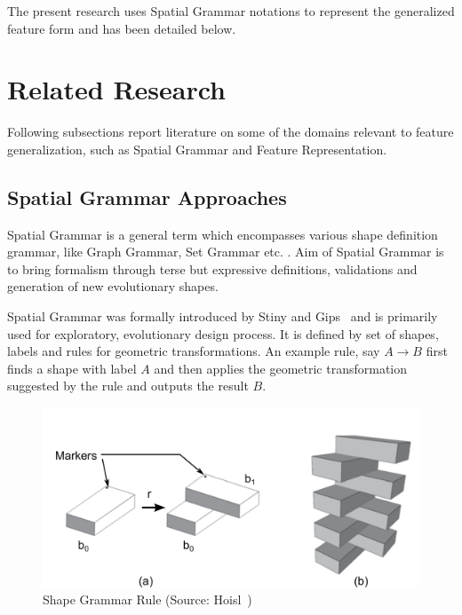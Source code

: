 The present research uses Spatial Grammar notations to represent the generalized feature form and has been detailed below. 

\section{Related Research}

Following subsections report literature on some of the domains relevant to feature generalization, such as Spatial Grammar and Feature Representation.
%

\subsection{Spatial Grammar Approaches}


Spatial Grammar is a general term which encompasses various shape definition grammar, like Graph Grammar, Set Grammar etc. \cite{mckay2012}. Aim of Spatial Grammar is to bring formalism through terse but expressive definitions, validations and generation of new evolutionary shapes. 

Spatial Grammar was formally introduced by Stiny and Gips~\cite{Stiny1971} and is primarily used for exploratory, evolutionary design process. It is defined by set of shapes, labels and rules for geometric transformations. An example rule, say $A \rightarrow B$ first finds a shape with label $A$ and then applies the geometric transformation suggested by the rule and outputs the result $B$. 



	\begin{figure}[!h]
	\centering
	\includegraphics[width=0.62\linewidth]{../Common/images/stinyrules.pdf}
	\caption{Shape Grammar Rule (Source: Hoisl~\cite{Hoisl2009})}
	\label{fig:able:StinyRules}
	\end{figure}


